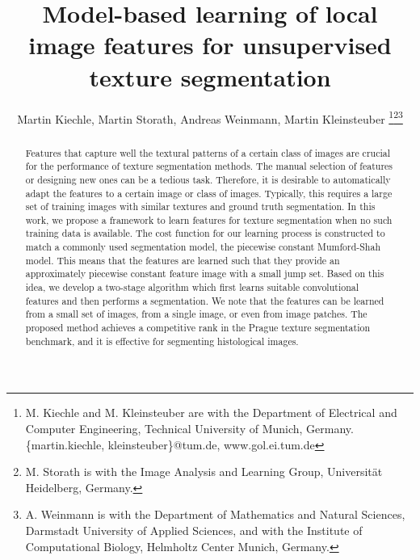 \documentclass[journal]{IEEEtran}
\begin{document}
\title{
Model-based learning of local image features for unsupervised  texture segmentation
}





\author{Martin Kiechle,
        Martin Storath,
        Andreas Weinmann,
        Martin Kleinsteuber
\thanks{M. Kiechle and M. Kleinsteuber are with the Department of Electrical and Computer Engineering, Technical University of Munich, Germany. \{martin.kiechle, kleinsteuber\}@tum.de, www.gol.ei.tum.de}\thanks{M. Storath is with the Image Analysis and Learning Group, Universität Heidelberg, Germany.}\thanks{A. Weinmann is with the Department of Mathematics and Natural Sciences, Darmstadt University of Applied Sciences, and with the Institute of Computational Biology, 
Helmholtz Center Munich, Germany.}}















\maketitle

\begin{abstract}
Features that capture well the textural patterns 
of a certain class of images
are crucial for the performance of texture segmentation methods. The 
manual selection of features  or designing new ones  can be a tedious task.
Therefore, it is desirable to automatically adapt the features to a certain image or class of images.
Typically, this requires a large set of training images with similar textures and ground truth segmentation.
In this work, we propose a framework to learn
features for texture segmentation when no such training data is available.
The cost function for our learning process 
is constructed to match a commonly used segmentation model, the piecewise constant Mumford-Shah model.
This means that the features are learned such that they provide an
approximately piecewise constant feature image 
with a small jump set.
Based on this idea, we develop a two-stage algorithm 
which first learns suitable convolutional features and then performs a segmentation.
We note that the features can be learned  
from a small set of images, from a single image, or even from image patches.
The proposed method achieves a competitive rank in the Prague 
texture segmentation benchmark,
 and it is effective for segmenting histological images.


 \end{abstract}
\end{document}
